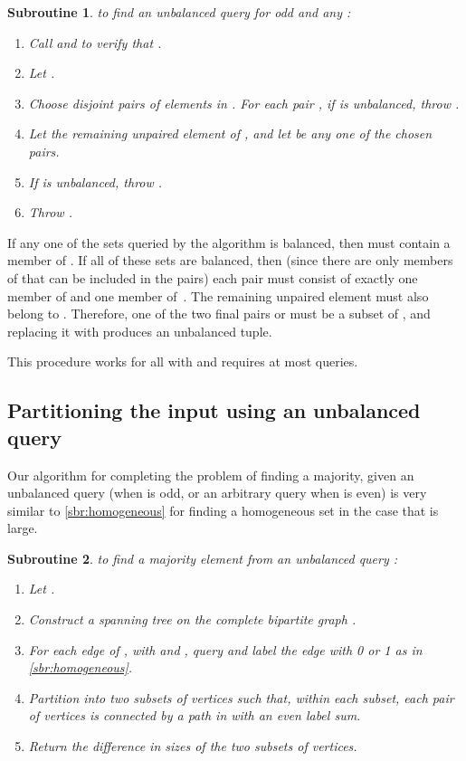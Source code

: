 \documentclass[11pt]{llncs}
\newtheorem{subroutine}{Subroutine}
\begin{document}
\begin{subroutine} to find an unbalanced query for odd  and any :
\begin{enumerate}
\item Call  and  to verify that .
\item Let .
\item Choose  disjoint pairs of elements in . For each pair ,
      if  is unbalanced, throw .
\item Let the remaining unpaired element of , and let  be any one of the chosen pairs.
\item If  is unbalanced, throw .
\item Throw .
\end{enumerate}
\end{subroutine}

If any one of the sets  queried by the algorithm is balanced, then  must contain a member of . If all  of these sets are balanced, then (since there are only  members of  that can be included in the pairs) each pair must consist of exactly one member of  and one member of~. The remaining unpaired element  must also belong to . Therefore, one of the two final pairs  or  must be a subset of , and replacing it with  produces an unbalanced tuple.

This procedure works for all  with  and requires at most  queries.

\subsection{Partitioning the input using an unbalanced query}

Our algorithm for completing the problem of finding a majority, given an unbalanced query  (when  is odd, or an arbitrary query  when  is even) is very similar to \autoref{sbr:homogeneous} for finding a homogeneous set in the case that  is large.

\begin{subroutine} to find a majority element from an unbalanced query :
\begin{enumerate}
\item Let .
\item Construct a spanning tree  on the complete bipartite graph .
\item For each edge  of , with  and , query  and label the edge with 0 or 1 as in \autoref{sbr:homogeneous}.
\item Partition  into two subsets of vertices such that, within each subset, each pair of vertices is connected by a path in  with an even label sum.
\item Return the difference in sizes of the two subsets of vertices. 
\end{enumerate}
\end{subroutine}
\end{document}

